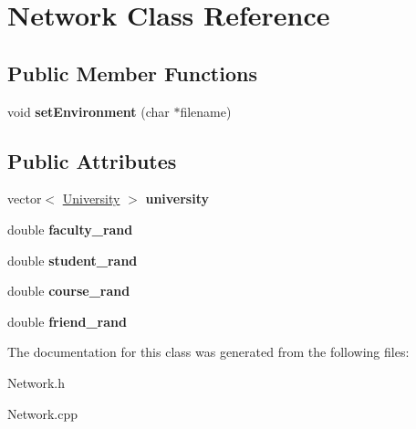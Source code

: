 \hypertarget{class_network}{\section{Network Class Reference}
\label{class_network}
}
\subsection*{Public Member Functions}
\begin{DoxyCompactItemize}
\item 
\hypertarget{class_network_a751386029f94bff254989ae06e928716}{void {\bfseries set\-Environment} (char $\ast$filename)}\label{class_network_a751386029f94bff254989ae06e928716}

\end{DoxyCompactItemize}
\subsection*{Public Attributes}
\begin{DoxyCompactItemize}
\item 
\hypertarget{class_network_add1e115147b64c1960d41ce2595f2b53}{vector$<$ \hyperlink{struct_university}{University} $>$ {\bfseries university}}\label{class_network_add1e115147b64c1960d41ce2595f2b53}

\item 
\hypertarget{class_network_af64190d1b2bac083864f0d4af3012d67}{double {\bfseries faculty\-\_\-rand}}\label{class_network_af64190d1b2bac083864f0d4af3012d67}

\item 
\hypertarget{class_network_a400dd443e279e059a02877bf12621ffd}{double {\bfseries student\-\_\-rand}}\label{class_network_a400dd443e279e059a02877bf12621ffd}

\item 
\hypertarget{class_network_a1087f925a98213d6d9df8209f7edd6bf}{double {\bfseries course\-\_\-rand}}\label{class_network_a1087f925a98213d6d9df8209f7edd6bf}

\item 
\hypertarget{class_network_af0ff85c8d6ff88486dd5d8a3ce3fd478}{double {\bfseries friend\-\_\-rand}}\label{class_network_af0ff85c8d6ff88486dd5d8a3ce3fd478}

\end{DoxyCompactItemize}


The documentation for this class was generated from the following files\-:\begin{DoxyCompactItemize}
\item 
Network.\-h\item 
Network.\-cpp\end{DoxyCompactItemize}
